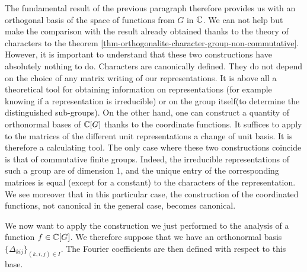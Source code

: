  
 The fundamental result of the previous paragraph therefore provides us with an orthogonal basis of the space of functions from $ G $ in $ \mathbb{C} $. We can not help but make the comparison with the result already obtained thanks to the theory of characters to the theorem \ref{thm-orthogonalite-character-group-non-commutative}. However, it is important to understand that these two constructions have absolutely nothing to do. Characters are canonically defined. They do not depend on the choice of any matrix writing of our representations. It is above all a theoretical tool for obtaining information on representations (for example knowing if a representation is irreducible) or on the group itself(to determine the distinguished sub-groups). On the other hand, one can construct a quantity of orthonormal bases of $ \mathbb{C} [G] $ thanks to the coordinate functions. It suffices to apply to the matrices of the different unit representations a change of unit basis. It is therefore a calculating tool. The only case where these two constructions coincide is that of commutative finite groups. Indeed, the irreducible representations of such a group are of dimension 1, and the unique entry of the corresponding matrices is equal (except for a constant) to the characters of the representation. We see moreover that in this particular case, the construction of the coordinated functions, not canonical in the general case, becomes canonical.
 
 
We now want to apply the construction we just performed to the analysis of a function $ f \in \mathbb{C} [G] $. We therefore suppose that we have an orthonormal basis $ \{\Delta_{kij}\}_{(k, i, j) \in I} $. The Fourier coefficients are then defined with respect to this base.
 
